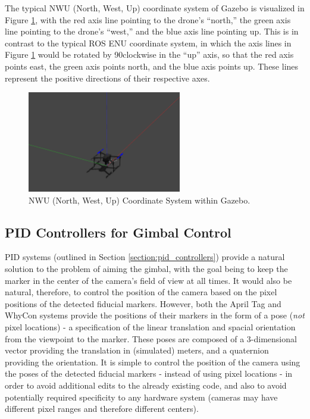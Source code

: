 The typical NWU (North, West, Up) coordinate system of Gazebo is visualized in Figure \ref{fig:nwu_coordinate_system}, with the red axis line pointing to the drone's ``north,'' the green axis line pointing to the drone's ``west,'' and the blue axis line pointing up. This is in contrast to the typical ROS \gls{ENU} coordinate system, in which the axis lines in Figure \ref{fig:nwu_coordinate_system} would be rotated by 90\degree clockwise in the ``up'' axis, so that the red axis points east, the green axis points north, and the blue axis points up. These lines represent the positive directions of their respective axes.

\begin{figure}[ht]
    \centering
    \includegraphics[width=0.6\textwidth]{images/nwu_coordinate_system.png}
    \caption{NWU (North, West, Up) Coordinate System within Gazebo.}
    \label{fig:nwu_coordinate_system}
\end{figure}

\subsection{PID Controllers for Gimbal Control}

\gls{PID} systems (outlined in Section \ref{section:pid_controllers}) provide a natural solution to the problem of aiming the gimbal, with the goal being to keep the marker in the center of the camera's field of view at all times. It would also be natural, therefore, to control the position of the camera based on the pixel positions of the detected fiducial markers. However, both the April Tag and WhyCon systems provide the positions of their markers in the form of a pose (\textit{not} pixel locations) - a specification of the linear translation and spacial orientation from the viewpoint to the marker. These poses are composed of a 3-dimensional vector providing the translation in (simulated) meters, and a quaternion providing the orientation. It is simple to control the position of the camera using the poses of the detected fiducial markers - instead of using pixel locations - in order to avoid additional edits to the already existing code, and also to avoid potentially required specificity to any hardware system (cameras may have different pixel ranges and therefore different centers).

